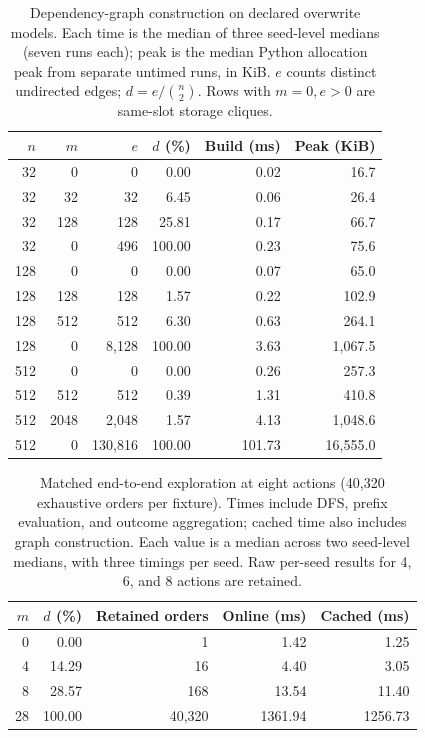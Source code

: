 \begin{table}[t]\centering\scriptsize\setlength{\tabcolsep}{2pt}
\caption{Dependency-graph construction on declared overwrite models. Each time is the median of three seed-level medians (seven runs each); peak is the median Python allocation peak from separate untimed runs, in KiB. $e$ counts distinct undirected edges; $d=e/\binom{n}{2}$. Rows with $m=0,e>0$ are same-slot storage cliques.}
\label{tab:dependency-construction}
\begin{tabular}{@{}rrrrrr@{}}\toprule
$n$ & $m$ & $e$ & $d$ (\%) & Build (ms) & Peak (KiB) \\
\midrule
32 & 0 & 0 & 0.00 & 0.02 & 16.7 \\
32 & 32 & 32 & 6.45 & 0.06 & 26.4 \\
32 & 128 & 128 & 25.81 & 0.17 & 66.7 \\
32 & 0 & 496 & 100.00 & 0.23 & 75.6 \\
\midrule
128 & 0 & 0 & 0.00 & 0.07 & 65.0 \\
128 & 128 & 128 & 1.57 & 0.22 & 102.9 \\
128 & 512 & 512 & 6.30 & 0.63 & 264.1 \\
128 & 0 & 8,128 & 100.00 & 3.63 & 1,067.5 \\
\midrule
512 & 0 & 0 & 0.00 & 0.26 & 257.3 \\
512 & 512 & 512 & 0.39 & 1.31 & 410.8 \\
512 & 2048 & 2,048 & 1.57 & 4.13 & 1,048.6 \\
512 & 0 & 130,816 & 100.00 & 101.73 & 16,555.0 \\
\bottomrule\end{tabular}\end{table}
\begin{table}[t]\centering\scriptsize\setlength{\tabcolsep}{3pt}
\caption{Matched end-to-end exploration at eight actions (40,320 exhaustive orders per fixture). Times include DFS, prefix evaluation, and outcome aggregation; cached time also includes graph construction. Each value is a median across two seed-level medians, with three timings per seed. Raw per-seed results for 4, 6, and 8 actions are retained.}
\label{tab:dependency-exploration}
\begin{tabular}{@{}rrrrr@{}}\toprule
$m$ & $d$ (\%) & Retained orders & Online (ms) & Cached (ms) \\ \midrule
0 & 0.00 & 1 & 1.42 & 1.25 \\
4 & 14.29 & 16 & 4.40 & 3.05 \\
8 & 28.57 & 168 & 13.54 & 11.40 \\
28 & 100.00 & 40,320 & 1361.94 & 1256.73 \\
\bottomrule\end{tabular}\end{table}

